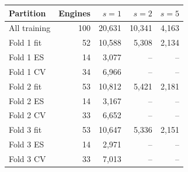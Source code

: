 \begin{tabular}{@{}lrrrr@{}}
\hline
Partition & Engines & $s=1$ & $s=2$ & $s=5$ \\
\hline
All training & 100 & 20,631 & 10,341 & 4,163 \\
Fold 1 fit & 52 & 10,588 & 5,308 & 2,134 \\
Fold 1 ES & 14 & 3,077 & -- & -- \\
Fold 1 CV & 34 & 6,966 & -- & -- \\
Fold 2 fit & 53 & 10,812 & 5,421 & 2,181 \\
Fold 2 ES & 14 & 3,167 & -- & -- \\
Fold 2 CV & 33 & 6,652 & -- & -- \\
Fold 3 fit & 53 & 10,647 & 5,336 & 2,151 \\
Fold 3 ES & 14 & 2,971 & -- & -- \\
Fold 3 CV & 33 & 7,013 & -- & -- \\
\hline
\end{tabular}
